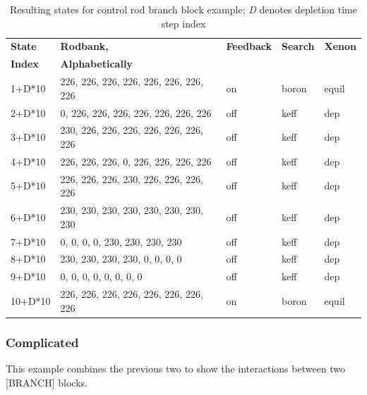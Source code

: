 \begin{table}[ht]
    \centering
    \caption{Resulting states for control rod branch block example; \emph{D} denotes depletion time step index}\label{tab:branch-example-rods}
    \begin{tabular}{|l|l|l|l|l|}\hline
    \textbf{State} & \textbf{Rodbank,} & \textbf{Feedback} & \textbf{Search} & \textbf{Xenon} \\
    \textbf{Index} & \textbf{Alphabetically} &  &  & \\\hline
    1+D*10 & 226, 226, 226, 226, 226, 226, 226, 226 & on & boron & equil \\\hline
    2+D*10 & 0, 226, 226, 226, 226, 226, 226, 226 & off & keff & dep \\\hline
    3+D*10 & 230, 226, 226, 226, 226, 226, 226, 226 & off & keff & dep \\\hline
    4+D*10 & 226, 226, 226, 0, 226, 226, 226, 226 & off & keff & dep \\\hline
    5+D*10 & 226, 226, 226, 230, 226, 226, 226, 226 & off & keff & dep \\\hline
    6+D*10 & 230, 230, 230, 230, 230, 230, 230, 230 & off & keff & dep \\\hline
    7+D*10 & 0, 0, 0, 0, 230, 230, 230, 230 & off & keff & dep \\\hline
    8+D*10 & 230, 230, 230, 230, 0, 0, 0, 0 & off & keff & dep \\\hline
    9+D*10 & 0, 0, 0, 0, 0, 0, 0, 0 & off & keff & dep \\\hline
    10+D*10 & 226, 226, 226, 226, 226, 226, 226, 226 & on & boron & equil \\\hline
    \end{tabular}
\end{table}

\FloatBarrier

\subsubsection{Complicated}

This example combines the previous two to show the interactions between two [BRANCH] blocks.

